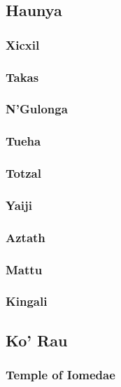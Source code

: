 	\subsection{Haunya}

		\subsubsection{Xicxil}
	
		\subsubsection{Takas}
	
		\subsubsection{N'Gulonga}
	
		\subsubsection{Tueha}

		\pagebreak

		\subsubsection{Totzal}

		\subsubsection{Yaiji}

		\subsubsection{Aztath}

		\subsubsection{Mattu}

		\subsubsection{Kingali}

	\subsection{Ko' Rau}

		\subsubsection{Temple of Iomedae}

